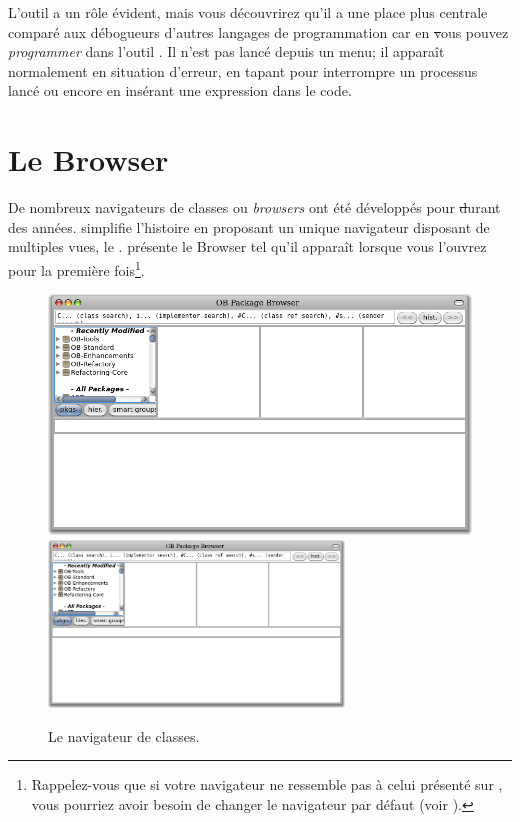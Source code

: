 \documentclass[a4paper,10pt,twoside]{book}
\begin{document}
L'outil  a un rôle évident, mais vous découvrirez qu'il a une place plus centrale comparé aux débogueurs d'autres langages de programmation
car en \st vous pouvez \emph{programmer} dans l'outil .  Il n'est pas lancé depuis un menu; il apparaît normalement en situation d'erreur,
en tapant  pour interrompre un processus lancé ou
encore en insérant une expression  dans le code.


\section{Le Browser} %

De nombreux navigateurs de classes ou \emph{browsers} ont été
développés pour \st durant des années. \pharo simplifie l'histoire
en proposant un unique navigateur disposant de multiples vues,
le . 
 présente le Browser tel qu'il apparaît
lorsque vous l'ouvrez pour la première fois\footnote{Rappelez-vous que si votre navigateur ne ressemble pas à 
celui présenté sur , vous pourriez avoir besoin 
de changer le navigateur par défaut (voir ).}.

\begin{figure}[htbp]
   \centering
   \ifluluelse
	 {\includegraphics[width=\textwidth]{SystemBrowser0} }
	 {\includegraphics[width=0.7\textwidth]{SystemBrowser0} }
   \caption{Le navigateur de classes.}
\end{figure}
\end{document}
